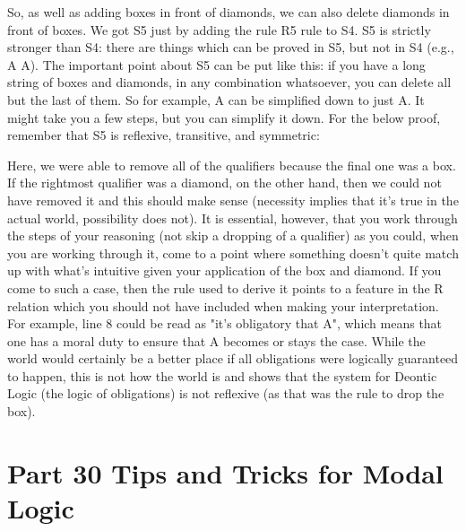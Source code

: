 So, as well as adding boxes in front of diamonds, we can also delete diamonds in front of boxes. We got S5 just by adding the rule R5 rule to S4. S5 is strictly stronger than S4: there are things which can be proved in S5, but not in S4 (e.g., \ediamond \ebox A \eif  \ebox A). The important point about S5 can be put like this: if you have a long string of boxes and diamonds, in any combination whatsoever, you can delete all but the last of them. So for example, \ediamond \ebox \ediamond \ediamond \ebox \ebox \ediamond \ebox A can be simplified down to just \ebox A. It might take you a few steps, but you can simplify it down. For the below proof, remember that S5 is reflexive, transitive, and symmetric: 
\begin{fitchproof}
		
\end{fitchproof}
Here, we were able to remove all of the qualifiers because the final one was a box. If the rightmost qualifier was a diamond, on the other hand, then we could not have removed it and this should make sense (necessity implies that it's true in the actual world, possibility does not). It is essential, however, that you work through the steps of your reasoning (not skip a dropping of a qualifier) as you could, when you are working through it, come to a point where something doesn't quite match up with what's intuitive given your application of the box and diamond. If you come to such a case, then the rule used to derive it points to a feature in the R relation which you should not have included when making your interpretation. For example, line 8 could be read as "it's obligatory that A", which means that one has a moral duty to ensure that A becomes or stays the case. While the world would certainly be a better place if all obligations were logically guaranteed to happen, this is not how the world is and shows that the system for Deontic Logic (the logic of obligations) is not reflexive (as that was the rule to drop the box). 
\chapter{Part 30 Tips and Tricks for Modal Logic}
